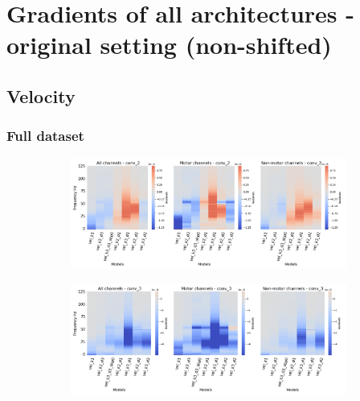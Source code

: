 \chapter{Gradients of all architectures - original setting (non-shifted)}\label{appendixA}


\section*{Velocity}\label{sec:velocity-appendixA}

\subsection*{Full dataset}\label{subsec:vel-full-dataset-appendixA}
\begin{figure}[!htb]
\centering
\begin{subfigure}[a]{\textwidth}
   \includegraphics[width=0.85\linewidth]{img/appendix/A/conv-2/m/vel-model-gradients-all_kinds}
   \caption{}
   \label{fig:vel-full-grads-conv2}
\end{subfigure}

\begin{subfigure}[b]{\textwidth}
   \includegraphics[width=0.85\linewidth]{img/appendix/A/conv-3/m/vel-model-gradients-all_kinds}
   \caption{}
   \label{fig:vel-full-grads-conv3}
\end{subfigure}
\end{figure}
\clearpage   

